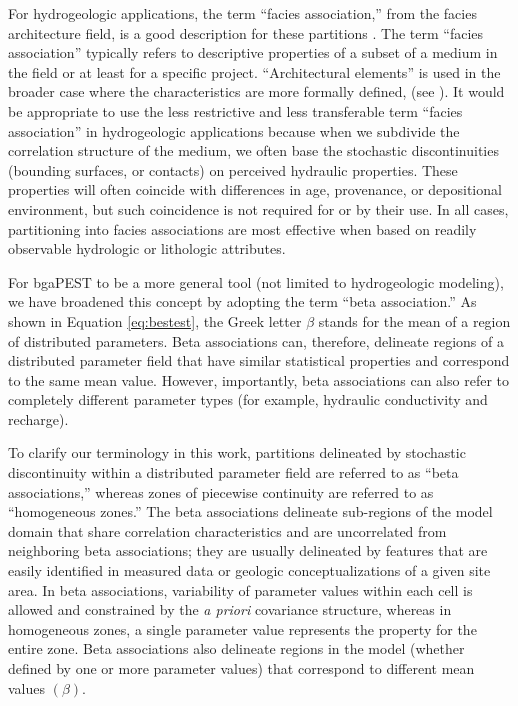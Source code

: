 \documentclass[11pt,oneside,onecolumn]{usgsreport}
\begin{document}
\begin{multicols}{2}
For hydrogeologic applications, the term ``facies association,''
from the facies architecture field, is a good description for these
partitions \citep{fienenIsthmusWRR}. The term ``facies association''
typically refers to descriptive properties of a subset of a medium
in the field or at least for a specific project. ``Architectural
elements'' is used in the broader case where the characteristics
are more formally defined, (see \citet{Collinson1969,Walker1984,Walker1992,SwiftEtAl2003}).
It would be appropriate to use the less restrictive and less transferable
term ``facies association'' in hydrogeologic applications because
when we subdivide the correlation structure of the medium, we often
base the stochastic discontinuities (bounding surfaces, or contacts)
on perceived hydraulic properties. These properties will often coincide
with differences in age, provenance, or depositional environment,
but such coincidence is not required for or by their use. In all cases,
partitioning into facies associations are most effective when based
on readily observable hydrologic or lithologic attributes.

For bgaPEST to be a more general tool (not limited to hydrogeologic
modeling), we have broadened this concept by adopting the term ``beta
association.'' As shown in Equation \ref{eq:bestest}, the Greek
letter $\beta$ stands for the mean of a region of distributed parameters.
Beta associations can, therefore, delineate regions of a distributed
parameter field that have similar statistical properties and correspond
to the same mean value. However, importantly, beta associations can
also refer to completely different parameter types (for example, hydraulic
conductivity and recharge). 

To clarify our terminology in this work, partitions delineated by
stochastic discontinuity within a distributed parameter field are
referred to as ``beta associations,'' whereas zones of piecewise
continuity are referred to as ``homogeneous zones.'' The beta associations
delineate sub-regions of the model domain that share correlation characteristics
and are uncorrelated from neighboring beta associations; they are
usually delineated by features that are easily identified in measured
data or geologic conceptualizations of a given site area. In beta
associations, variability of parameter values within each cell is
allowed and constrained by the \emph{a priori} covariance structure,
whereas in homogeneous zones, a single parameter value represents
the property for the entire zone. Beta associations also delineate
regions in the model (whether defined by one or more parameter values)
that correspond to different mean values $\left(\beta\right)$.


\end{multicols}
\end{document}
